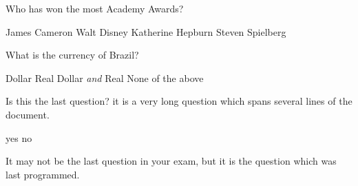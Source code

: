 \documentclass[letter]{article}
\begin{document}
\begin{mcquestions}
          \begin{mcanswerslist}[ordinal]
          \end{mcanswerslist}

\question Who has won the most Academy Awards?

          \begin{mcanswerslist}
          \answer James Cameron
          \answer[correct] Walt Disney
          \answer Katherine Hepburn
          \answer Steven Spielberg
          \end{mcanswerslist}

\question What is the currency of Brazil?

          \begin{mcanswerslist}[{1,2,3,4},{2,1,3,4}]
          \answer Dollar
          \answer[correct] Real
          \answer Dollar \emph{and} Real
          \answer None of the above
          \end{mcanswerslist} 
 
 
 
 
 
\question Is this the last question? it is a very long question which spans several lines of the document.

          \begin{mcanswerslist}[permutenone]
          \answer[correct] yes
          \answer no
          \end{mcanswerslist}
          
          \begin{mcexplanation}
          It may not be the last question in your exam, but it is the question which was last programmed.
          \end{mcexplanation} 
 
 
\end{mcquestions}











 
 
 
\end{document}
